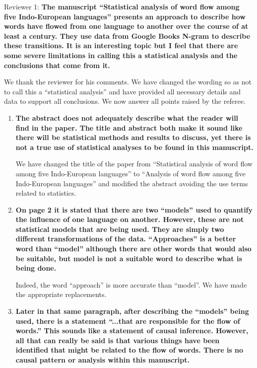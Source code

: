 \documentclass{article}
\begin{document}
	
Reviewer 1: \textbf{The manuscript “Statistical analysis of word flow among five
Indo-European languages” presents an approach to describe how words have flowed
from one language to another over the course of at least a century. They use
data from Google Books N-gram to describe these transitions. It is an
interesting topic but I feel that there are some severe limitations in calling
this a statistical analysis and the conclusions that come from it.}

We thank the reviewer for his comments. We have changed the wording so as not to call this 
a ``statistical analysis'' and have provided all necessary details and data to support all
conclusions. We now answer all points raised by the referee. 

\begin{enumerate}

\item %
\textbf{The abstract does not adequately describe what the reader
will find in the paper. The title and abstract both make it sound like there
will be statistical methods and results to discuss, yet there is not a true use
of statistical analyses to be found in this manuscript.}

We have changed the title of the paper from 
``Statistical analysis of word flow among five Indo-European languages'' to 
``Analysis of word flow among five Indo-European languages'' and modified the abstract avoiding
the use terms related to statistics.
\item \textbf{On page 2 it is stated that there are two ``models'' used to quantify
the influence of one language on another. However, these are not
statistical models that are being used. They are simply two different
transformations of the data. “Approaches” is a better word than
``model'' although there are other words that would also be suitable,
but model is not a suitable word to describe what is being done.}

Indeed, the word ``approach'' is more accurate than ``model''. We have made 
the appropriate replacements. 
\item \textbf{Later in that same paragraph, after describing the “models” being
used, there is a statement ``...that are responsible for the flow of
words.'' This sounds like a statement of causal inference. However, all
that can really be said is that various things have been identified
that might be related to the flow of words. There is no causal pattern
or analysis within this manuscript.}


\end{enumerate}
\end{document}
